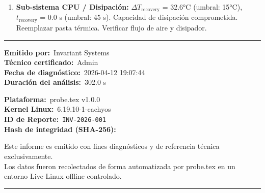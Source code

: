 \documentclass[11pt, a4paper, final]{article}
\newcommand{\sectionrule}{%
  \vspace{4pt}%
  \noindent\textcolor{AMBorder}{\rule{\linewidth}{0.5pt}}%
  \vspace{4pt}%
}
\begin{document}
\vspace{0.6cm}

\begin{tcolorbox}[
  enhanced,
  colback   = AMLight,
  colframe  = AMPrimary,
  boxrule   = 0.8pt,
  arc       = 0pt,
  title     = {\bfseries Directivas de Intervención},
  coltitle  = white,
  attach boxed title to top left={yshift=-2mm, xshift=8mm},
  boxed title style={colback=AMPrimary, arc=0pt, boxrule=0pt},
  left=10pt, right=10pt, top=12pt, bottom=8pt
]
  \small
  \begin{enumerate}[leftmargin=*, itemsep=4pt, topsep=2pt]
    \item \textbf{Sub-sistema CPU / Disipación:} $\Delta T_{\text{recovery}}$ = 32.6°C (umbral: 15°C), $t_{\text{recovery}}$ = 0.0 s (umbral: 45 s). Capacidad de disipación comprometida. Reemplazar pasta térmica. Verificar flujo de aire y disipador.
  \end{enumerate}
\end{tcolorbox}


\vspace{0.8cm}
\sectionrule

\begin{minipage}[t]{0.48\linewidth}
  \small\color{AMSlate}
  \textbf{Emitido por:}\ Invariant Systems\\
  \textbf{Técnico certificado:}\ Admin\\
  \textbf{Fecha de diagnóstico:}\ 2026-04-12 19:07:44\\
  \textbf{Duración del análisis:}\ 302.0 s
\end{minipage}
\hfill
\begin{minipage}[t]{0.48\linewidth}
  \raggedright\small\color{AMSlate}
  \textbf{Plataforma:}\ probe\textcolor{redtex}{.tex} v1.0.0\\
  \textbf{Kernel Linux:}\ 6.19.10-1-cachyos\\
  \textbf{ID de Reporte:}\ \texttt{INV-2026-001}\\
  \textbf{Hash de integridad (SHA-256):}\ \texttt{\tiny }
\end{minipage}

\vspace{0.5cm}

\begin{center}
  \scriptsize\color{AMSlate}
  Este informe es emitido con fines diagnósticos y de referencia técnica exclusivamente.\\
  Los datos fueron recolectados de forma automatizada por probe\textcolor{redtex}{.tex}
  en un entorno Live Linux offline controlado.\\[3pt]
  \textcolor{AMBorder}{\rule{0.45\linewidth}{0.3pt}}
\end{center}
\end{document}

